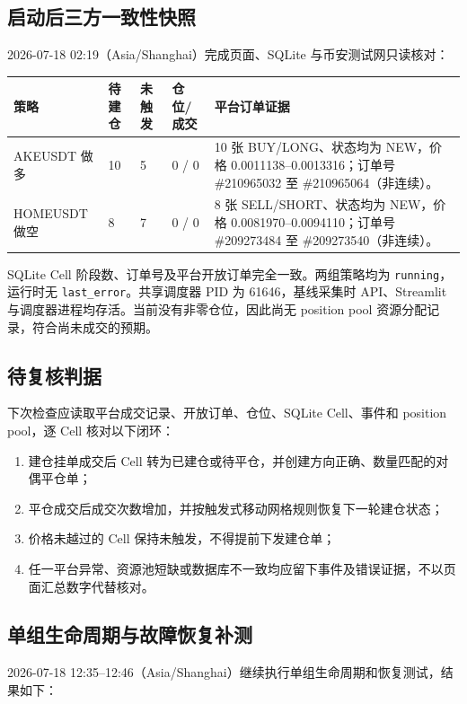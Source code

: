 \subsection{启动后三方一致性快照}

2026-07-18 02:19（Asia/Shanghai）完成页面、SQLite 与币安测试网只读核对：

\begin{longtable}{p{2.3cm}p{2.1cm}p{2.1cm}p{2.1cm}p{5.8cm}}
  \toprule
  策略 & 待建仓 & 未触发 & 仓位/成交 & 平台订单证据 \\
  \midrule
  \endhead
  AKEUSDT 做多 & 10 & 5 & 0 / 0 & 10 张 BUY/LONG、状态均为 NEW，价格 0.0011138--0.0013316；订单号 \#210965032 至 \#210965064（非连续）。 \\
  HOMEUSDT 做空 & 8 & 7 & 0 / 0 & 8 张 SELL/SHORT、状态均为 NEW，价格 0.0081970--0.0094110；订单号 \#209273484 至 \#209273540（非连续）。 \\
  \bottomrule
\end{longtable}

SQLite Cell 阶段数、订单号及平台开放订单完全一致。两组策略均为 \texttt{running}，运行时无 \texttt{last\_error}。共享调度器 PID 为 61646，基线采集时 API、Streamlit 与调度器进程均存活。当前没有非零仓位，因此尚无 position pool 资源分配记录，符合尚未成交的预期。

\subsection{待复核判据}

下次检查应读取平台成交记录、开放订单、仓位、SQLite Cell、事件和 position pool，逐 Cell 核对以下闭环：

\begin{enumerate}
  \item 建仓挂单成交后 Cell 转为已建仓或待平仓，并创建方向正确、数量匹配的对偶平仓单；
  \item 平仓成交后成交次数增加，并按触发式移动网格规则恢复下一轮建仓状态；
  \item 价格未越过的 Cell 保持未触发，不得提前下发建仓单；
  \item 任一平台异常、资源池短缺或数据库不一致均应留下事件及错误证据，不以页面汇总数字代替核对。
\end{enumerate}

\subsection{单组生命周期与故障恢复补测}

2026-07-18 12:35--12:46（Asia/Shanghai）继续执行单组生命周期和恢复测试，结果如下：

